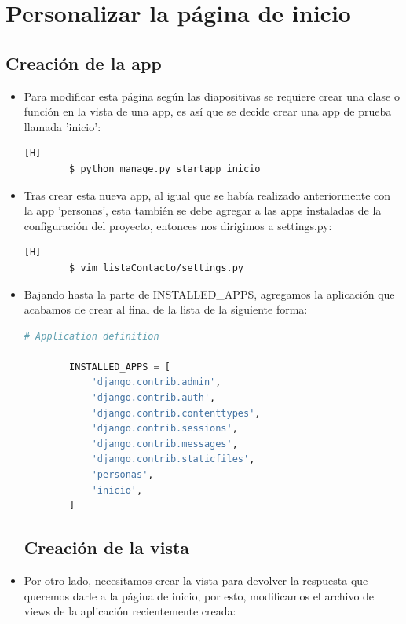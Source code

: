 \documentclass{article}
\begin{document}
    
    \section{Personalizar la página de inicio}
        \subsection{Creación de la app}
        \begin{itemize}
            \item Para modificar esta página según las diapositivas se requiere crear una clase o función en la vista de una app, es así que se decide crear una app de prueba llamada 'inicio':
             
        \begin{lstlisting}[language=bash,caption={Creación de la app inicio}][H]
        $ python manage.py startapp inicio
        \end{lstlisting}
            
            \item Tras crear esta nueva app, al igual que se había realizado anteriormente con la app 'personas', esta también se debe agregar a las apps instaladas de la configuración del proyecto, entonces nos dirigimos a settings.py:
            
        \begin{lstlisting}[language=bash,caption={Ingresando a settings.py}][H]
        $ vim listaContacto/settings.py
        \end{lstlisting}
        
            \item Bajando hasta la parte de INSTALLED\_APPS, agregamos la aplicación que acabamos de crear al final de la lista de la siguiente forma:
            
        \begin{lstlisting}[language=Python, caption={Aplicaciones del proyecto}]
        # Application definition
    
        INSTALLED_APPS = [
            'django.contrib.admin',
            'django.contrib.auth',
            'django.contrib.contenttypes',
            'django.contrib.sessions',
            'django.contrib.messages',
            'django.contrib.staticfiles',
            'personas',
            'inicio',
        ]
        \end{lstlisting}
        \subsection{Creación de la vista}
            \item Por otro lado, necesitamos crear la vista para devolver la respuesta que queremos darle a la página de inicio, por esto, modificamos el archivo de views de la aplicación recientemente creada:


\end{itemize}
\end{document}
